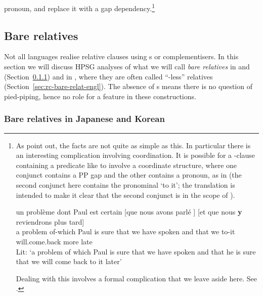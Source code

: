 \documentclass[output=paper
 	        ,biblatex
                ,babelshorthands
                ,newtxmath
                ,draftmode
                ,colorlinks, citecolor=brown
]{langscibook}
\begin{document}
pronoun, and replace it with a gap dependency.\footnote{As \cite{AbeilleGodard07} point
  out, the facts are not quite as simple as this. In particular there is an interesting
  complication involving coordination. It is possible for a -clause containing a
  predicate like  to involve a coordinate structure, where one conjunct
  contains a PP gap and the other contains a pronoun, as in  (the
  second conjunct here contains the pronominal  `to it'; the  translation is
  intended to make it clear that the second conjunct is in the scope of ).
  \begin{exe}\ex\label{x:rc-80}\gll
    un problème dont         Paul est certain [que nous avons parlé  \trace] [et que nous \textbf{y} reviendrons plus tard]\\
    a     problem   of-which Paul is   sure      \hphantom{[}that we have 
    spoken \hphantom{\trace} \hphantom{[}and that we to-it will.come.back more late\\
    \glt Lit: `a problem of which Paul is sure that we have  spoken and that
    he is sure that we will come back to it later'
  \end{exe}
  Dealing with this
  involves a formal complication that we leave aside here. See \cite{AbeilleGodard07}.}


\subsection{Bare relatives}
\label{sec:rc-bare-relatives}

Not all languages realise relative clauses using s or complementisers. In this section we
will discuss HPSG analyses of what we will call \emph{bare relatives} in  and 
(Section~\ref{sec:rc-bare-relat-japan}) and in , where they are often called
``-less'' relatives (Section~\ref{sec:rc-bare-relat-engl}).  The absence of s means there is no question of pied-piping, hence no role for a 
feature in these constructions.

\subsubsection{Bare relatives in Japanese and Korean}
\label{sec:rc-bare-relat-japan}
\end{document}
